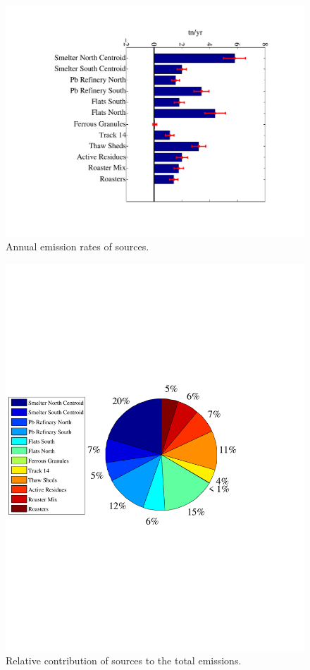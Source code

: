 \documentclass[11pt]{article}
\begin{document}
\begin{figure}[htp]
  \centering
  \includegraphics[angle = 90, scale = 0.5, clip = true, 
   trim = 4cm 2cm 3cm 2cm]{emissions.pdf}
  \caption{Annual emission rates of sources.}
\end{figure}

\begin{figure}[htp]
  \centering
  \includegraphics[angle = 0, scale = 0.7, clip = true, 
   trim = 0cm 9cm 5cm 8cm]{piechart.pdf}
  \caption{Relative contribution of sources to the total emissions.}
\end{figure}
\end{document}
